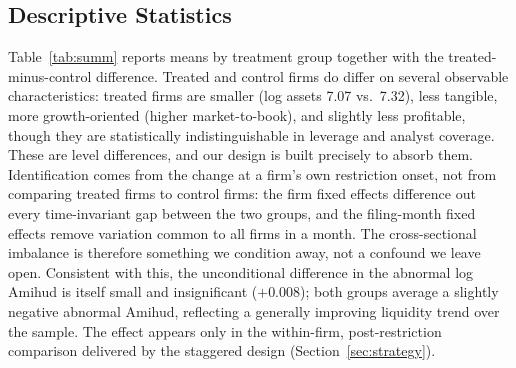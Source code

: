 \documentclass[12pt]{article}
\begin{document}
\subsection{Descriptive Statistics}\label{sec:data_desc}
Table~\ref{tab:summ} reports means by treatment group together with the treated-minus-control difference. Treated and control firms do differ on several observable characteristics: treated firms are smaller (log assets 7.07 vs.\ 7.32), less tangible, more growth-oriented (higher market-to-book), and slightly less profitable, though they are statistically indistinguishable in leverage and analyst coverage. These are level differences, and our design is built precisely to absorb them. Identification comes from the change at a firm's own restriction onset, not from comparing treated firms to control firms: the firm fixed effects difference out every time-invariant gap between the two groups, and the filing-month fixed effects remove variation common to all firms in a month. The cross-sectional imbalance is therefore something we condition away, not a confound we leave open. Consistent with this, the unconditional difference in the abnormal log Amihud is itself small and insignificant ($+0.008$); both groups average a slightly negative abnormal Amihud, reflecting a generally improving liquidity trend over the sample. The effect appears only in the within-firm, post-restriction comparison delivered by the staggered design (Section~\ref{sec:strategy}).



\end{document}
